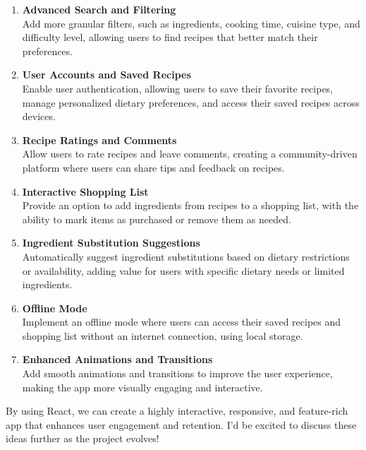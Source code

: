 \documentclass{article}
\begin{document}
\begin{enumerate}
    \item \textbf{Advanced Search and Filtering} \\ 
    Add more granular filters, such as ingredients, cooking time, cuisine type, and difficulty level, allowing users to find recipes that better match their preferences.

    \item \textbf{User Accounts and Saved Recipes} \\ 
    Enable user authentication, allowing users to save their favorite recipes, manage personalized dietary preferences, and access their saved recipes across devices.

    \item \textbf{Recipe Ratings and Comments} \\ 
    Allow users to rate recipes and leave comments, creating a community-driven platform where users can share tips and feedback on recipes.

    \item \textbf{Interactive Shopping List} \\ 
    Provide an option to add ingredients from recipes to a shopping list, with the ability to mark items as purchased or remove them as needed.

    \item \textbf{Ingredient Substitution Suggestions} \\ 
    Automatically suggest ingredient substitutions based on dietary restrictions or availability, adding value for users with specific dietary needs or limited ingredients.

    \item \textbf{Offline Mode} \\ 
    Implement an offline mode where users can access their saved recipes and shopping list without an internet connection, using local storage.

    \item \textbf{Enhanced Animations and Transitions} \\ 
    Add smooth animations and transitions to improve the user experience, making the app more visually engaging and interactive.
\end{enumerate}

By using React, we can create a highly interactive, responsive, and feature-rich app that enhances user engagement and retention. I’d be excited to discuss these ideas further as the project evolves!
\end{document}
